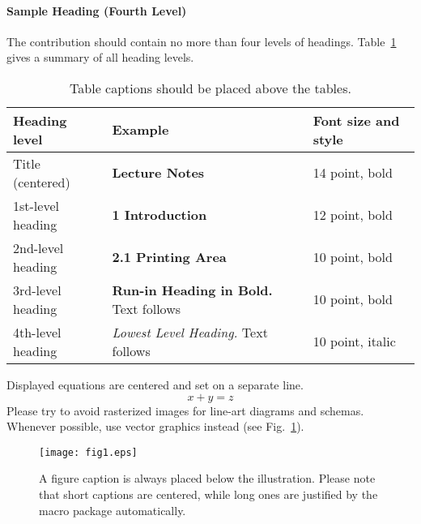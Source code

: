 \documentclass[[a4paper, 11pt]{article}
\begin{document}
\paragraph{Sample Heading (Fourth Level)}
The contribution should contain no more than four levels of
headings. Table~\ref{tab1} gives a summary of all heading levels.

\begin{table}
\caption{Table captions should be placed above the
tables.}\label{tab1}
\begin{tabular}{|l|l|l|}
\hline
Heading level &  Example & Font size and style\\
\hline
Title (centered) &  {\Large\bfseries Lecture Notes} & 14 point, bold\\
1st-level heading &  {\large\bfseries 1 Introduction} & 12 point, bold\\
2nd-level heading & {\bfseries 2.1 Printing Area} & 10 point, bold\\
3rd-level heading & {\bfseries Run-in Heading in Bold.} Text follows & 10 point, bold\\
4th-level heading & {\itshape Lowest Level Heading.} Text follows & 10 point, italic\\
\hline
\end{tabular}
\end{table}


\noindent Displayed equations are centered and set on a separate
line.
\begin{equation}
x + y = z
\end{equation}
Please try to avoid rasterized images for line-art diagrams and
schemas. Whenever possible, use vector graphics instead (see
Fig.~\ref{fig1}).

\begin{figure}
\texttt{[image: fig1.eps]}
\caption{A figure caption is always placed below the illustration.
Please note that short captions are centered, while long ones are
justified by the macro package automatically.} \label{fig1}
\end{figure}




%
%
%
% 


\end{document}
